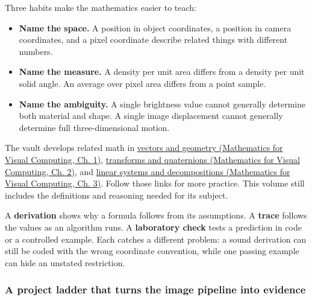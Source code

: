 Three habits make the mathematics easier to teach:

\begin{itemize}
\tightlist
\item
  \textbf{Name the space.} A position in object coordinates, a position in camera coordinates, and a pixel coordinate describe related things with different numbers.
\item
  \textbf{Name the measure.} A density per unit area differs from a density per unit solid angle. An average over pixel area differs from a point sample.
\item
  \textbf{Name the ambiguity.} A single brightness value cannot generally determine both material and shape. A single image displacement cannot generally determine full three-dimensional motion.
\end{itemize}

The vault develops related math in \href{../02-Mathematics-for-Visual-Computing/main.pdf\#nameddest=01-foundations-i-ch017-the-panel-gives-us-a-reason-to-learn}{vectors and geometry (Mathematics for Visual Computing, Ch. 1)}, \href{../02-Mathematics-for-Visual-Computing/main.pdf\#nameddest=01-foundations-i-ch018-keep-the-promises-visible-while-moving-between-representations}{transforms and quaternions (Mathematics for Visual Computing, Ch. 2)}, and \href{../02-Mathematics-for-Visual-Computing/main.pdf\#nameddest=01-foundations-i-ch019-the-graphics-problem-hiding-inside-a-matrix-equation}{linear systems and decompositions (Mathematics for Visual Computing, Ch. 3)}. Follow those links for more practice. This volume still includes the definitions and reasoning needed for its subject.

A \textbf{derivation} shows why a formula follows from its assumptions. A \textbf{trace} follows the values as an algorithm runs. A \textbf{laboratory check} tests a prediction in code or a controlled example. Each catches a different problem: a sound derivation can still be coded with the wrong coordinate convention, while one passing example can hide an unstated restriction.

\subsubsection{A project ladder that turns the image pipeline into evidence}\label{03-visual-computing-i-ch001-a-project-ladder-that-turns-the-image-pipeline-into-evidence}

\hypertarget{03-visual-computing-i-ch001-a-project-ladder-that-turns-the-image-pipeline-into-evidence}{}

